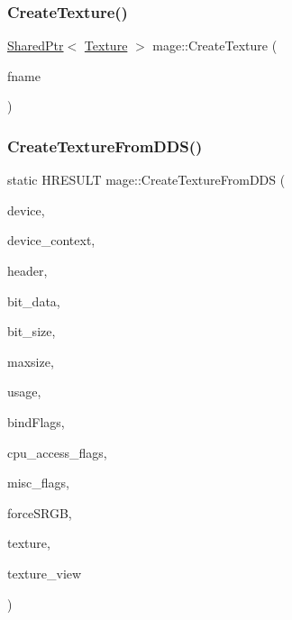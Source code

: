 \hypertarget{namespacemage_ac27913e621bde0fd01312183aafaaca0}{}\label{namespacemage_ac27913e621bde0fd01312183aafaaca0} 
\subsubsection{\texorpdfstring{Create\+Texture()}{CreateTexture()}}
{\footnotesize\ttfamily \hyperlink{namespacemage_a1e01ae66713838a7a67d30e44c67703e}{Shared\+Ptr}$<$ \hyperlink{classmage_1_1_texture}{Texture} $>$ mage\+::\+Create\+Texture (\begin{DoxyParamCaption}\item[{const wstring \&}]{fname }\end{DoxyParamCaption})}

\hypertarget{namespacemage_a53fb464961d52002316f17c59ce58078}{}\label{namespacemage_a53fb464961d52002316f17c59ce58078} 
\subsubsection{\texorpdfstring{Create\+Texture\+From\+D\+D\+S()}{CreateTextureFromDDS()}}
{\footnotesize\ttfamily static H\+R\+E\+S\+U\+LT mage\+::\+Create\+Texture\+From\+D\+DS (\begin{DoxyParamCaption}\item[{\+\_\+\+In\+\_\+ I\+D3\+D11\+Device2 $\ast$}]{device,  }\item[{\+\_\+\+In\+\_\+opt\+\_\+ I\+D3\+D11\+Device\+Context $\ast$}]{device\+\_\+context,  }\item[{\+\_\+\+In\+\_\+ const \hyperlink{structmage_1_1_d_d_s___h_e_a_d_e_r}{D\+D\+S\+\_\+\+H\+E\+A\+D\+ER} $\ast$}]{header,  }\item[{\+\_\+\+In\+\_\+reads\+\_\+bytes\+\_\+(bit\+\_\+size) const uint8\+\_\+t $\ast$}]{bit\+\_\+data,  }\item[{\+\_\+\+In\+\_\+ size\+\_\+t}]{bit\+\_\+size,  }\item[{\+\_\+\+In\+\_\+ size\+\_\+t}]{maxsize,  }\item[{\+\_\+\+In\+\_\+ D3\+D11\+\_\+\+U\+S\+A\+GE}]{usage,  }\item[{\+\_\+\+In\+\_\+ uint32\+\_\+t}]{bind\+Flags,  }\item[{\+\_\+\+In\+\_\+ uint32\+\_\+t}]{cpu\+\_\+access\+\_\+flags,  }\item[{\+\_\+\+In\+\_\+ uint32\+\_\+t}]{misc\+\_\+flags,  }\item[{\+\_\+\+In\+\_\+ bool}]{force\+S\+R\+GB,  }\item[{\+\_\+\+Outptr\+\_\+opt\+\_\+ I\+D3\+D11\+Resource $\ast$$\ast$}]{texture,  }\item[{\+\_\+\+Outptr\+\_\+opt\+\_\+ I\+D3\+D11\+Shader\+Resource\+View $\ast$$\ast$}]{texture\+\_\+view }\end{DoxyParamCaption})\hspace{0.3cm}{\ttfamily [static]}}


